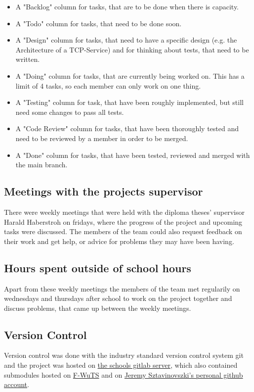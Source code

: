 \begin{itemize}
\item A "Backlog" column for tasks, that are to be done when there is capacity.
\item A "Todo" column for tasks, that need to be done soon.
\item A "Design" column for tasks, that need to have a specific design (e.g. the Architecture of a TCP-Service) and for thinking about tests, that need to be written.
\item A "Doing" column for tasks, that are currently being worked on. This has a limit of 4 tasks, so each member can only work on one thing.
\item A "Testing" column for task, that have been roughly implemented, but still need some changes to pass all tests.
\item A "Code Review" column for tasks, that have been thoroughly tested and need to be reviewed by a member in order to be merged.
\item A "Done" column for tasks, that have been tested, reviewed and merged with the main branch.
\end{itemize}

\subsection{Meetings with the projects supervisor}
There were weekly meetings that were held with the diploma theses' supervisor Harald Haberstroh on fridays, where the progress of the project and upcoming tasks were discussed.
The members of the team could also request feedback on their work and get help, or advice for problems they may have been having.

\subsection{Hours spent outside of school hours} 
Apart from these weekly meetings the members of the team met regularily on wednesdays and thursdays after school to work on the project together and discuss problems, 
that came up between the weekly meetings.

\subsection{Version Control}
Version control was done with the industry standard version control system git and the project was hosted on \href{https://gitlab.htlwrn.ac.at/Sztavinovszki.Jeremy/RECT}{the schools gitlab server}, 
which also contained submodules hosted on \href{https://github.com/F-WuTS/}{F-WuTS} and on \href{https://github.com/if-loop69420}{Jeremy Sztavinovszki's personal github account}.

